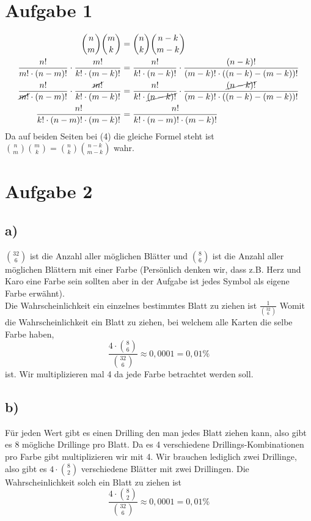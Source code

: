 \documentclass[12pt,german,a4paper]{article}
\title{#1}
\author{Mike Lenz, Jonas Tesfamariam}
\begin{document}
\maketitle	

\section*{Aufgabe 1}
\begin{align}
	\binom{n}{m}\binom{m}{k}&=\binom{n}{k}\binom{n-k}{m-k} \\
  \frac{ n! }{ m!\cdot(n-m)! }\cdot \frac{ m! }{ k!\cdot(m-k)! } &= \frac{ n! }{ k!\cdot(n-k)! }\cdot \frac{ (n-k)! }{ (m-k)!\cdot((n-k)-(m-k))! } \\
	\frac{ n! }{ \cancel{m!}\cdot(n-m)! }\cdot \frac{ \cancel{m!} }{ k!\cdot(m-k)! } &= \frac{ n! }{ k!\cdot\cancel{(n-k)!} }\cdot \frac{ \cancel{(n-k)!} }{ (m-k)!\cdot((n-k)-(m-k))! } \\ 
	\frac{ n! }{ k!\cdot (n-m)!\cdot(m-k)! } &= \frac{ n! }{ k!\cdot (n-m)!\cdot(m-k)! } 
\end{align}
Da auf beiden Seiten bei (4) die gleiche Formel steht ist $\binom{n}{m}\binom{m}{k}=\binom{n}{k}\binom{n-k}{m-k}$ wahr. 
\pagebreak
\section*{Aufgabe 2}
\subsection*{a)}
$\binom{32}{6}$ ist die Anzahl aller möglichen Blätter und $\binom{8}{6}$ ist die Anzahl aller möglichen Blättern mit einer Farbe (Persönlich denken wir, dass z.B. Herz und Karo eine Farbe sein sollten aber in der Aufgabe ist jedes Symbol als eigene Farbe erwähnt). \\
Die Wahrscheinlichkeit ein einzelnes bestimmtes Blatt zu ziehen ist 
$\frac{ 1 }{ \binom{32}{6}}$
Womit die Wahrscheinlichkeit ein Blatt zu ziehen, bei welchem alle Karten die selbe Farbe haben,
$$
\frac{ 4\cdot\binom{8}{6} }{ \binom{32}{6} } \approx 0,0001 = 0,01\%
$$
ist. Wir multiplizieren mal 4 da jede Farbe betrachtet werden soll.
\subsection*{b)}
Für jeden Wert gibt es einen Drilling den man jedes Blatt ziehen kann, also gibt es 8 mögliche Drillinge pro Blatt. Da es 4 verschiedene Drillings-Kombinationen pro Farbe gibt multiplizieren wir mit 4. Wir brauchen lediglich zwei Drillinge, also gibt es
$4\cdot\binom{8}{2}$ verschiedene Blätter mit zwei Drillingen.
Die Wahrscheinlichkeit solch ein Blatt zu ziehen ist
$$
\frac{ 4\cdot\binom{8}{2} }{ \binom{32}{6} } \approx 0,0001 = 0,01\%
$$
\pagebreak
\end{document}
